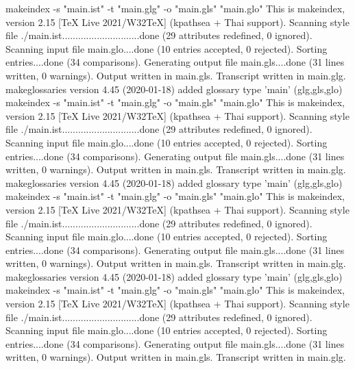 makeindex  -s "main.ist" -t "main.glg" -o "main.gls" "main.glo"
This is makeindex, version 2.15 [TeX Live 2021/W32TeX] (kpathsea + Thai support).
Scanning style file ./main.ist.............................done (29 attributes redefined, 0 ignored).
Scanning input file main.glo....done (10 entries accepted, 0 rejected).
Sorting entries....done (34 comparisons).
Generating output file main.gls....done (31 lines written, 0 warnings).
Output written in main.gls.
Transcript written in main.glg.
makeglossaries version 4.45 (2020-01-18)
added glossary type 'main' (glg,gls,glo)
makeindex  -s "main.ist" -t "main.glg" -o "main.gls" "main.glo"
This is makeindex, version 2.15 [TeX Live 2021/W32TeX] (kpathsea + Thai support).
Scanning style file ./main.ist.............................done (29 attributes redefined, 0 ignored).
Scanning input file main.glo....done (10 entries accepted, 0 rejected).
Sorting entries....done (34 comparisons).
Generating output file main.gls....done (31 lines written, 0 warnings).
Output written in main.gls.
Transcript written in main.glg.
makeglossaries version 4.45 (2020-01-18)
added glossary type 'main' (glg,gls,glo)
makeindex  -s "main.ist" -t "main.glg" -o "main.gls" "main.glo"
This is makeindex, version 2.15 [TeX Live 2021/W32TeX] (kpathsea + Thai support).
Scanning style file ./main.ist.............................done (29 attributes redefined, 0 ignored).
Scanning input file main.glo....done (10 entries accepted, 0 rejected).
Sorting entries....done (34 comparisons).
Generating output file main.gls....done (31 lines written, 0 warnings).
Output written in main.gls.
Transcript written in main.glg.
makeglossaries version 4.45 (2020-01-18)
added glossary type 'main' (glg,gls,glo)
makeindex  -s "main.ist" -t "main.glg" -o "main.gls" "main.glo"
This is makeindex, version 2.15 [TeX Live 2021/W32TeX] (kpathsea + Thai support).
Scanning style file ./main.ist.............................done (29 attributes redefined, 0 ignored).
Scanning input file main.glo....done (10 entries accepted, 0 rejected).
Sorting entries....done (34 comparisons).
Generating output file main.gls....done (31 lines written, 0 warnings).
Output written in main.gls.
Transcript written in main.glg.

